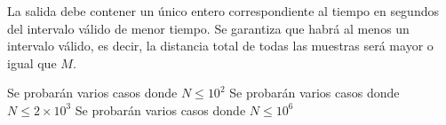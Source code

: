 \documentclass{oci}
\begin{document}
\begin{outputDescription}
  La salida debe contener un único entero correspondiente al tiempo en segundos
  del intervalo válido de menor tiempo.
  Se garantiza que habrá al menos un intervalo válido, es decir, la distancia
  total de todas las muestras será mayor o igual que $M$.
\end{outputDescription}

\begin{scoreDescription}
   Se probarán varios casos donde $N\leq 10^2$
   Se probarán varios casos donde $N\leq 2\times 10^3$
   Se probarán varios casos donde $N\leq 10^6$
\end{scoreDescription}

\begin{sampleDescription}
\end{sampleDescription}
\end{document}
